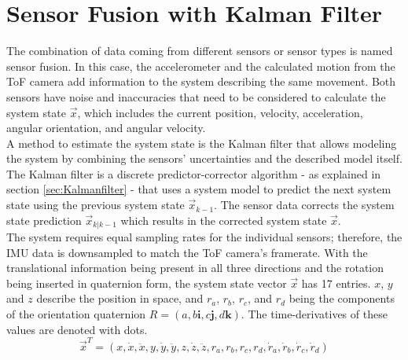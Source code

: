 \section{Sensor Fusion with Kalman Filter}
\label{sec:SensorFusion}
The combination of data coming from different sensors or sensor types is named sensor fusion. In this case, the accelerometer and the calculated motion from the ToF camera add information to the system describing the same movement. Both sensors have noise and inaccuracies that need to be considered to calculate the system state $\vec{x}$, which includes the current position, velocity, acceleration, angular orientation, and angular velocity.\\
A method to estimate the system state is the Kalman filter that allows modeling the system by combining the sensors' uncertainties and the described model itself. The Kalman filter is a discrete predictor-corrector algorithm - as explained in section \ref{sec:Kalmanfilter} - that uses a system model to predict the next system state using the previous system state $\vec{x}_{k-1}$. The sensor data corrects the system state prediction $\vec{x}_{k|k-1}$ which results in the corrected system state $\vec{x}$.\\
The system requires equal sampling rates for the individual sensors; therefore, the IMU data is downsampled to match the ToF camera's framerate.
With the translational information being present in all three directions and the rotation being inserted in quaternion form, the system state vector $\vec{x}$ has 17 entries. $x$, $y$ and $z$ describe the position in space, and $r_{a}$, $r_{b}$, $r_{c}$, and $r_{d}$ being the components of the orientation quaternion $R = (a, b\textbf{i}, c\textbf{j}, d\textbf{k})$. The time-derivatives of these values are denoted with dots.
\begin{equation*}
    \vec{x}^{T} = (
        x, \dot{x}, \ddot{x}, y, \dot{y}, \ddot{y}, z, \dot{z}, \ddot{z}, r_{a}, r_{b}, r_{c}, r_{d}, \dot{r}_{a}, \dot{r}_{b}, \dot{r}_{c}, \dot{r}_{d})
\end{equation*}
